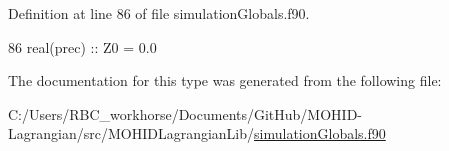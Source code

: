Definition at line 86 of file simulation\+Globals.\+f90.


\begin{DoxyCode}
86         \textcolor{keywordtype}{real(prec)}   :: Z0 = 0.0
\end{DoxyCode}


The documentation for this type was generated from the following file\+:\begin{DoxyCompactItemize}
\item 
C\+:/\+Users/\+R\+B\+C\+\_\+workhorse/\+Documents/\+Git\+Hub/\+M\+O\+H\+I\+D-\/\+Lagrangian/src/\+M\+O\+H\+I\+D\+Lagrangian\+Lib/\mbox{\hyperlink{simulation_globals_8f90}{simulation\+Globals.\+f90}}\end{DoxyCompactItemize}
